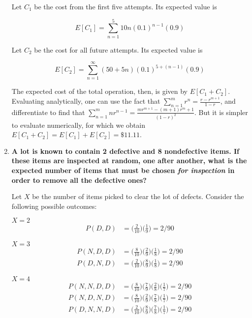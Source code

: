 \documentclass[10pt, oneside]{article}   	%
\theoremstyle{definition}
\begin{document}
\begin{enumerate}[label=7.\arabic*]
Let $C_1$ be the cost from the first five attempts. Its expected value is

\[ E[C_1] = \sum^5_{n=1} 10n (0.1)^{n-1} (0.9) \]

Let $C_2$ be the cost for all future attempts. Its expected value is

\[ E[C_2] = \sum_{n=1}^\infty (50 + 5n) (0.1)^{5 + (n-1)} (0.9) \]

The expected cost of the total operation, then, is given by $E[C_1 + C_2]$. Evaluating analytically, one can use the fact that $\sum^m_{n=1} r^n = \frac{r - r^{m+1}}{1-r}$, and differentiate to find that $\sum^m_{n=1} nr^{n-1} = \frac{mr^{m+1} - (m+1) r^m + 1}{(1-r)^2}$. But it is simpler to evaluate numerically, for which we obtain $E[C_1 + C_2] = E[C_1] + E[C_2] = \boxed{\$ 11.11}$.

\item  \begin{tcolorbox}[
  colback=Cerulean!5!white,
  colframe=Cerulean!75!black]
\textbf{A lot is known to contain 2 defective and 8 nondefective items. If these items are inspected at random, one after another, what is the expected number of items that must be chosen \textit{for inspection} in order to remove all the defective ones?}
\end{tcolorbox}

Let $X$ be the number of items picked to clear the lot of defects. Consider the following possible outcomes:

$X = 2$
\begin{align*}
P(D, D) &= \Big( \frac{2}{10} \Big) \Big( \frac{1}{9} \Big) = 2/90 
\end{align*}

$X = 3$
\begin{align*}
P(N,D,D) &= \Big( \frac{8}{10} \Big) \Big( \frac{2}{9} \Big) \Big( \frac{1}{8} \Big) = 2/90 \\
P(D, N, D) &= \Big( \frac{2}{10} \Big) \Big( \frac{8}{9} \Big) \Big( \frac{1}{8} \Big) = 2/90 
\end{align*}

$X = 4$
\begin{align*}
P(N, N, D,D) &= \Big( \frac{8}{10} \Big) \Big( \frac{7}{9} \Big) \Big( \frac{2}{8} \Big) \Big( \frac{1}{7} \Big) = 2/90 \\
P(N, D, N,D) &= \Big( \frac{8}{10} \Big) \Big( \frac{2}{9} \Big) \Big( \frac{7}{8} \Big) \Big( \frac{1}{7} \Big) = 2/90 \\
P(D, N, N,D) &= \Big( \frac{2}{10} \Big) \Big( \frac{8}{9} \Big) \Big( \frac{7}{8} \Big) \Big( \frac{1}{7} \Big) = 2/90 \\
\end{align*}


\end{enumerate}
\end{document}
